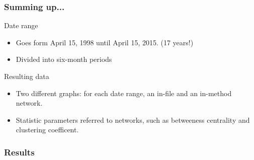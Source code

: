 \documentclass{beamer}
\begin{document}

\begin{frame}
\frametitle{Summing up...}
\begin{block}{Date range}
\begin{itemize}
\item Goes form April 15, 1998 until April 15, 2015. (17 years!)
\item Divided into six-month periods
\end{itemize}
\end{block}

\begin{block}{Resulting data}
\begin{itemize}
\item Two different graphs: for each date range, 
an in-file and an in-method network.
\item Statistic parameters referred to networks, such as betweeness centrality and clustering coefficent.
\end{itemize}
\end{block}

\end{frame}

\subsubsection{Results}
\end{document}
